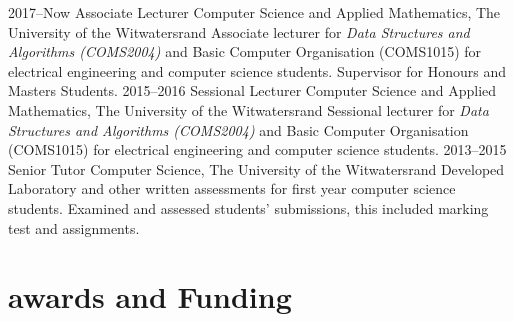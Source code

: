 \documentclass[]{friggeri-cv} %
\begin{document}
\begin{entrylist}
\entry
{2017--Now}
{Associate {\normalfont Lecturer}}
{Computer Science and Applied Mathematics, The University of the Witwatersrand}
{Associate lecturer for \textit{Data Structures and Algorithms (COMS2004)} and Basic Computer Organisation (COMS1015) for electrical engineering and computer science students. Supervisor for Honours and Masters Students. 
}
\entry
{2015--2016}
{Sessional {\normalfont Lecturer}}
{Computer Science and Applied Mathematics, The University of the Witwatersrand}
{Sessional lecturer for \textit{Data Structures and Algorithms (COMS2004)} and Basic Computer Organisation (COMS1015) for electrical engineering and computer science students.  
}
\entry
{2013--2015}
{Senior {\normalfont Tutor}}
{Computer Science, The University of the Witwatersrand}
{Developed Laboratory and other written assessments for first year computer science students. Examined and assessed students' submissions, this included marking test and assignments.}
\end{entrylist}


\section{awards and Funding}
\end{document}
